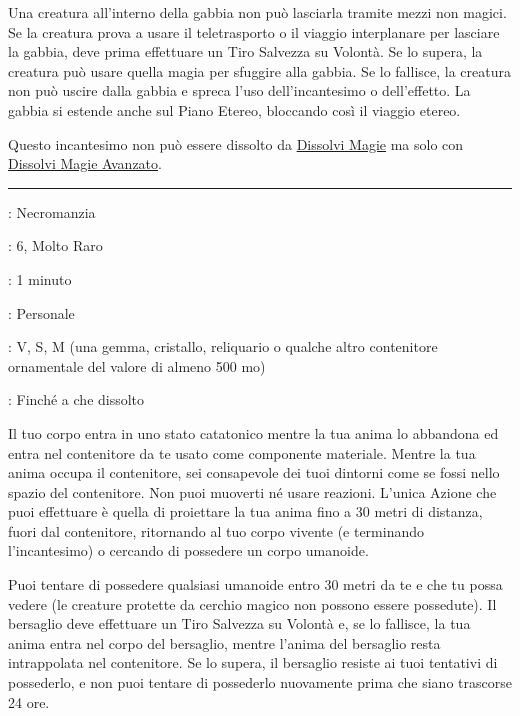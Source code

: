 \begin{multicols}{2}
Una creatura all'interno della gabbia non può lasciarla tramite mezzi non magici. Se la creatura prova a usare il teletrasporto o il viaggio interplanare per lasciare la gabbia, deve prima effettuare un Tiro Salvezza su Volontà. Se lo supera, la creatura può usare quella magia per sfuggire alla gabbia. Se lo fallisce, la creatura non può uscire dalla gabbia e spreca l'uso dell'incantesimo o dell'effetto. La gabbia si estende anche sul Piano Etereo, bloccando così il viaggio etereo.

Questo incantesimo non può essere dissolto da \hyperlink{dissolvimagie}{Dissolvi Magie} ma solo con \hyperlink{dissolvimagieavanzato}{Dissolvi Magie Avanzato}.

\smallskip\noindent\rule{\linewidth}{2pt} \hypertarget{Giara Magica}{}\medskip{}
\noindent
\begin{description}[noitemsep, topsep=0pt, parsep=0pt, partopsep=0pt, leftmargin=0cm, labelwidth=2.8cm]
	\item[\textbf{Lista di Magia}]: Necromanzia
	\item[\textbf{Livello}]: 6, Molto Raro
	\item[\textbf{T. di Lancio}]: 1 minuto
	\item[\textbf{Gittata}]: Personale
	\item[\textbf{Componenti}]: V, S, M (una gemma, cristallo, reliquario o qualche altro contenitore ornamentale del valore di almeno 500 mo)
	\item[\textbf{Durata}]: Finché a che dissolto
\end{description}

Il tuo corpo entra in uno stato catatonico mentre la tua anima lo abbandona ed entra nel contenitore da te usato come componente materiale. Mentre la tua anima occupa il contenitore, sei consapevole dei tuoi dintorni come se fossi nello spazio del contenitore. Non puoi muoverti né usare reazioni. L'unica Azione che puoi effettuare è quella di proiettare la tua anima fino a 30 metri di distanza, fuori dal contenitore, ritornando al tuo corpo vivente (e terminando l'incantesimo) o cercando di possedere un corpo umanoide.

Puoi tentare di possedere qualsiasi umanoide entro 30 metri da te e che tu possa vedere (le creature protette da cerchio magico non possono essere possedute). Il bersaglio deve effettuare un Tiro Salvezza su Volontà e, se lo fallisce, la tua anima entra nel corpo del bersaglio, mentre l'anima del bersaglio resta intrappolata nel contenitore. Se lo supera, il bersaglio resiste ai tuoi tentativi di possederlo, e non puoi tentare di possederlo nuovamente prima che siano trascorse 24 ore.


\end{multicols}
